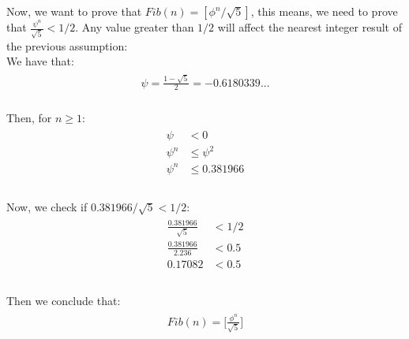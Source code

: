 \documentclass[paper=a4, fontsize=11pt]{scrartcl} %
\numberwithin{equation}{section} %
\numberwithin{figure}{section} %
\numberwithin{table}{section} %
\begin{document}
Now, we want to prove that $Fib(n) = [\phi^n/\sqrt5]$, this means, we need to prove that $\frac{\psi^n}{\sqrt5} < 1/2$. Any value greater than $1/2$ will affect the nearest integer result of the previous assumption:\\

We have that:\\

\begin{align}
  \begin{split}
    \psi = \frac{1 - \sqrt5}{2} = -0.6180339...
  \end{split}
\end{align}\\

Then, for $n \geq 1$:\\

\begin{align}
  \begin{split}
    \psi &< 0\\
    \psi^n &\leq \psi^2\\
    \psi^n &\leq 0.381966\\
  \end{split}
\end{align}\\

Now, we check if $0.381966/\sqrt5 < 1/2$:\\

\begin{align}
  \begin{split}
    \frac{0.381966}{\sqrt5} &< 1/2\\
    \frac{0.381966}{2.236} &< 0.5\\
    0.17082 &< 0.5\\
  \end{split}
\end{align}\\

Then we conclude that:\\

\begin{align}
  \begin{split}
    Fib(n) = \bigg[\frac{\phi^n}{\sqrt5}\bigg]
  \end{split}
\end{align}\\
\end{document}
